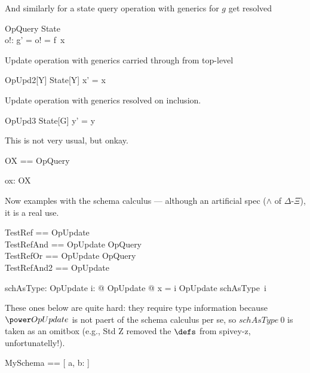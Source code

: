 \documentclass{article}
\begin{document}
And similarly for a state query operation with generics for $g$ get resolved
\begin{schema}{OpQuery}
  \Xi State \\
  o!: \nat
\where
   g' = o! = f~x
\end{schema}

Update operation with generics carried through from top-level
\begin{schema}{OpUpd2}[Y]
   \Delta State[Y]
\where
    x' = x 
\end{schema}

Update operation with generics resolved on inclusion.
\begin{schema}{OpUpd3}
   \Delta State[G]
\where
    y' = y 
\end{schema}

This is not very usual, but onkay.
\begin{zed}
   OX == \pre OpQuery
\end{zed}

\begin{axdef}
   ox: OX
\end{axdef}

Now examples with the schema calculus --- although an artificial spec ($\land$ of $\Delta$-$\Xi$), it is a real use.
\begin{zed}
   TestRef     == OpUpdate \\
   TestRefAnd  == OpUpdate \land OpQuery \\
   TestRefOr   == OpUpdate \lor OpQuery \\
   TestRefAnd2 == OpUpdate \land [ v: \nat ]
\end{zed}

\begin{axdef}
   schAsType: \nat \fun \power OpUpdate
\where
   \forall i: \nat @ \exists OpUpdate @ x = i \land \theta OpUpdate \in schAsType~i 
\end{axdef}

These ones below are quite hard: they require type information because $\power OpUpdate$ 
is not paert of the schema calculus per se, so $schAsType~0$ is taken as an omitbox
(e.g., Std Z removed the $\defs$ from spivey-z, unfortunatelly!).
%

\begin{zed}
   MySchema == [ a, b: \nat ]
\end{zed}
\end{document}
